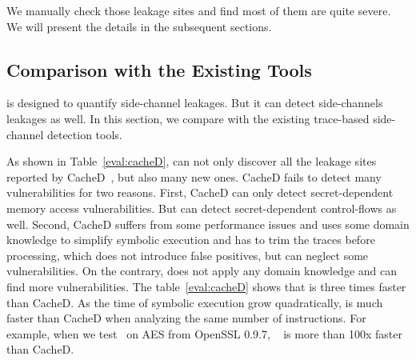 We manually check those leakage sites and find most of them are quite severe.
We will present the details in the subsequent sections.

\subsection{Comparison with the Existing Tools}
\label{eval:scala}


\tool{} is designed to quantify side-channel leakages. But it can detect
side-channels leakages as well. In this section, we compare \tool{} with the
existing trace-based side-channel detection tools.

As shown in Table~\ref{eval:cacheD},
\tool{} can not only discover all the leakage sites reported by CacheD~\cite{203878}, but also
many new ones. CacheD fails to detect many vulnerabilities for two
reasons. First, CacheD can only detect secret-dependent memory access
vulnerabilities. But \tool{} can detect secret-dependent control-flows as well.
Second, CacheD suffers from some performance issues and uses some domain
knowledge to simplify symbolic execution and has to trim the traces before
processing, which does not introduce false positives, but can neglect some
vulnerabilities. On the contrary, \tool{} does not apply any domain knowledge
and can find more vulnerabilities. The table~\ref{eval:cacheD} shows that
\tool{} is three times faster than CacheD. As the time of symbolic execution
grow quadratically, \tool{} is much faster than CacheD when analyzing the same
number of instructions. For example, when we test~\tool{} on AES from OpenSSL
0.9.7, ~\tool{} is more than 100x faster than CacheD.

